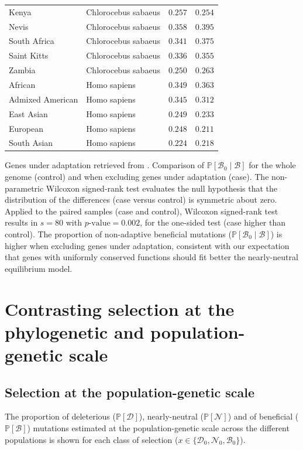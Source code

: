 \documentclass{article}
\newcommand{\proba}{\mathbb{P}}
\newcommand{\SphyDel}{\mathcal{D}_0}
\newcommand{\SphyNeu}{\mathcal{N}_0}
\newcommand{\SphyBen}{\mathcal{B}_0}
\newcommand{\Sphyclass}{x}
\newcommand{\given}{\mid}
\newcommand{\SpopDel}{\mathcal{D}}
\newcommand{\SpopNeu}{\mathcal{N}}
\newcommand{\SpopBen}{\mathcal{B}}
\newcommand{\ProbaPopDel}{\proba [ \SpopDel]}
\newcommand{\ProbaPopNeu}{\proba [ \SpopNeu ]}
\newcommand{\ProbaPopBen}{\proba [ \SpopBen ]}
\newcommand{\pvalue}{p\text{-value}}
\begin{document}
\begin{center}
\begin{tabular}{|l|l|r|r|}
            \rowcolor{LIGHTGREY} Kenya & Chlorocebus sabaeus & $ 0.257$ & $ 0.254$ \\
            \rowcolor{LIGHTGREY} Nevis & Chlorocebus sabaeus & $ 0.358$ & $ 0.395$ \\
            \rowcolor{LIGHTGREY} South Africa & Chlorocebus sabaeus & $ 0.341$ & $ 0.375$ \\
            \rowcolor{LIGHTGREY} Saint Kitts & Chlorocebus sabaeus & $ 0.336$ & $ 0.355$ \\
            \rowcolor{LIGHTGREY} Zambia & Chlorocebus sabaeus & $ 0.250$ & $ 0.263$ \\
            African & Homo sapiens & $ 0.349$ & $ 0.363$ \\
            Admixed American & Homo sapiens & $ 0.345$ & $ 0.312$ \\
            East Asian & Homo sapiens & $ 0.249$ & $ 0.233$ \\
            European & Homo sapiens & $ 0.248$ & $ 0.211$ \\
            South Asian & Homo sapiens & $ 0.224$ & $ 0.218$ \\
            \bottomrule
        \end{tabular}
    \end{center}
    Genes under adaptation retrieved from \textcite{latrille_genes_2023}.
    Comparison of $\proba[\SphyBen\given \SpopBen ]$ for the whole genome (control) and when excluding genes under adaptation (case).
    The non-parametric Wilcoxon signed-rank test evaluates the null hypothesis that the distribution of the differences (case versus control) is symmetric about zero.
    Applied to the paired samples (case and control), Wilcoxon signed-rank test results in $s=80$ with $\pvalue=0.002$, for the one-sided test (case higher than control).
    The proportion of non-adaptive beneficial mutations ($\proba[\SphyBen\given \SpopBen ]$) is higher when excluding genes under adaptation, consistent with our expectation that genes with uniformly conserved functions should fit better the nearly-neutral equilibrium model.

    \newpage

    \section{Contrasting selection at the phylogenetic and population-genetic scale}

    \subsection{Selection at the population-genetic scale}
    The proportion of deleterious ($\ProbaPopDel$), nearly-neutral ($\ProbaPopNeu$) and of beneficial ($\ProbaPopBen$) mutations estimated at the population-genetic scale across the different populations is shown for each class of selection ($\Sphyclass \in \{\SphyDel, \SphyNeu, \SphyBen \}$).
\end{document}
